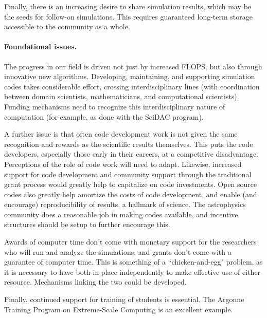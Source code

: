 \documentclass[11pt,twocolumn]{article}
\begin{document}
Finally, there is an increasing desire to share simulation results,
which may be the seeds for follow-on simulations.  This
requires guaranteed long-term storage accessible to the community as a
whole.

\paragraph*{Foundational issues.}

The progress in our field is driven not just by increased FLOPS, but
also through innovative new algorithms.  Developing, maintaining, and
supporting simulation codes takes considerable effort, crossing
interdisciplinary lines (with coordination between domain scientists,
mathematicians, and computational scientists).  Funding mechanisms
need to recognize this interdisciplinary nature of computation (for
example, as done with the SciDAC program).

A further issue is that
often code development work is not given the same recognition and
rewards as the scientific results themselves.  This puts the code
developers, especially those early in their careers, at a competitive
disadvantage.  Perceptions of the role of code work will need to
adapt.  Likewise, increased support for code development and community
support through the traditional grant process would greatly help to
capitalize on code investments.  Open source codes also greatly help
amortize the costs of code development, and enable (and encourage)
reproducibility of results, a hallmark of science.  The astrophysics
community does a reasonable job in making codes available, and
incentive structures should be setup to further encourage this.

Awards of computer time don't come with monetary support for the
researchers who will run and analyze the simulations, and grants don't
come with a guarantee of computer time.  This is something of a
``chicken-and-egg" problem, as it is necessary to have both in place
independently to make effective use of either resource.  Mechanisms
linking the two could be developed.

Finally, continued support for training of students is essential. The
Argonne Training Program on Extreme-Scale Computing is an excellent
example.
\end{document}
